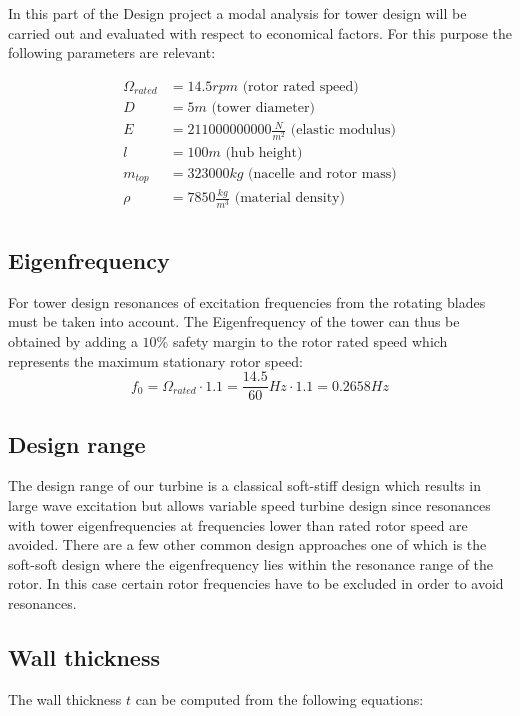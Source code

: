 \documentclass[10pt]{article}
\begin{document}
In this part of the Design project a modal analysis for tower design will be carried out and evaluated with respect to economical factors. For this purpose the following parameters are relevant:

\begin{align*}
	\Omega_{rated} &= 14.5 rpm \text{ (rotor rated speed)} \\
	D &= 5m \text{ (tower diameter)} \\
	E &=211000000000 \frac{N}{m^2} \text{ (elastic modulus)} \\
	l &=100m \text{ (hub height)} \\
	m_{top} &=323000 kg\text{ (nacelle and rotor mass)} \\
	\rho &=7850 \frac{kg}{m^3}\text{ (material density)} \\
\end{align*}

\subsection{Eigenfrequency}
For tower design resonances of excitation frequencies from the rotating blades must be taken into account. The Eigenfrequency of the tower can thus be obtained by adding a $10 \%$ safety margin to the rotor rated speed which represents the maximum stationary rotor speed:
\begin{equation*}
	f_0 = \Omega_{rated} \cdot 1.1 = \frac{14.5}{60} Hz \cdot 1.1 = 0.2658 Hz
\end{equation*}

\subsection{Design range}
The design range of our turbine is a classical soft-stiff design which results in large wave excitation but allows variable speed turbine design since resonances with tower eigenfrequencies at frequencies lower than rated rotor speed are avoided. There are a few other common design approaches one of which is the soft-soft design where the eigenfrequency lies within the resonance range of the rotor. In this case certain rotor frequencies have to be excluded in order to avoid resonances.

\subsection{Wall thickness}
The wall thickness $t$ can be computed from the following equations:
\end{document}
